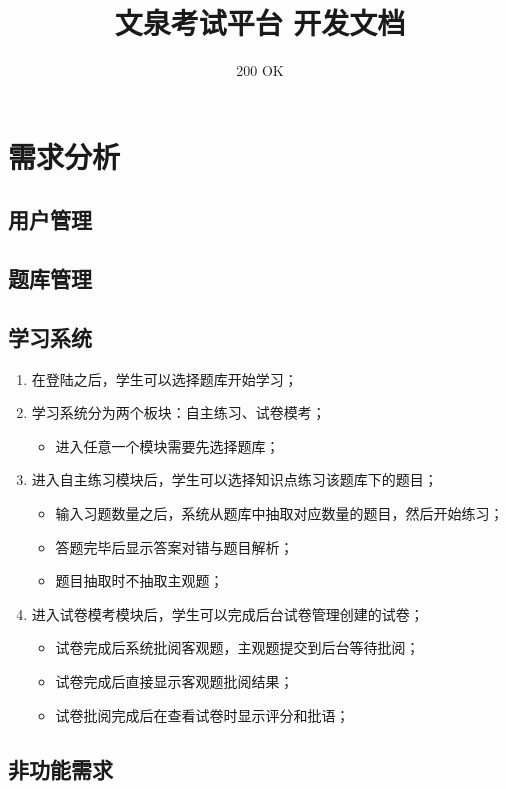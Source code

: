 \documentclass{article}
\title{文泉考试平台 开发文档}
\author{200 OK}
\date{}
\begin{document}
\maketitle

\section{需求分析}
    \subsection{用户管理}
    
    \subsection{题库管理}
    
    \subsection{学习系统}
    	\begin{enumerate}
    		\item 在登陆之后，学生可以选择题库开始学习；
    		\item 学习系统分为两个板块：自主练习、试卷模考；
    		\begin{itemize}
    			\item 进入任意一个模块需要先选择题库；
    		\end{itemize}
    		\item 进入自主练习模块后，学生可以选择知识点练习该题库下的题目；
    		\begin{itemize}
    			\item 输入习题数量之后，系统从题库中抽取对应数量的题目，然后开始练习；
    			\item 答题完毕后显示答案对错与题目解析；
    			\item 题目抽取时不抽取主观题；
    		\end{itemize}
   			\item 进入试卷模考模块后，学生可以完成后台试卷管理创建的试卷；
   			\begin{itemize}
   				\item 试卷完成后系统批阅客观题，主观题提交到后台等待批阅；
   				\item 试卷完成后直接显示客观题批阅结果；
   				\item 试卷批阅完成后在查看试卷时显示评分和批语；
   			\end{itemize}
    	\end{enumerate}
    \subsection{非功能需求}
\end{document}

